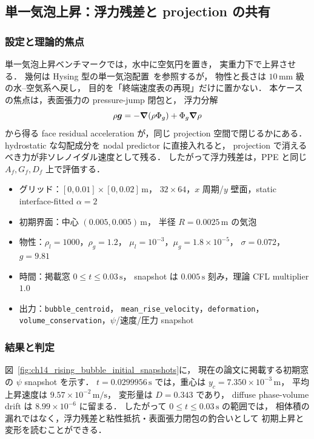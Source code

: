 \subsection{単一気泡上昇：浮力残差と projection の共有}
\label{sec:val_rising_bubble}

\subsubsection{設定と理論的焦点}

単一気泡上昇ベンチマークでは，水中に空気円を置き，
実重力下で上昇させる．
幾何は Hysing 型の単一気泡配置~\cite{Hysing2009}を参照するが，
物性と長さは $10\,\mathrm{mm}$ 級の水--空気系へ戻し，
目的を「終端速度表の再現」だけに置かない．
本ケースの焦点は，表面張力の pressure-jump 閉包と，
浮力分解
\[
  \rho\bm{g}=-\bm{\nabla}(\rho\Phi_g)+\Phi_g\bm{\nabla}\rho
\]
から得る face residual acceleration が，同じ projection 空間で閉じるかにある．
hydrostatic な勾配成分を nodal predictor に直接入れると，
projection で消えるべき力が非ソレノイダル速度として残る．
したがって浮力残差は，PPE と同じ $A_f,G_f,D_f$ 上で評価する．

\begin{itemize}[noitemsep,leftmargin=2em]
  \item グリッド：$[0,0.01]\times[0,0.02]\,\mathrm{m}$，
        $32\times64$，$x$ 周期/$y$ 壁面，static interface-fitted $\alpha=2$
  \item 初期界面：中心 $(0.005,0.005)\,\mathrm{m}$，
        半径 $R=0.0025\,\mathrm{m}$ の気泡
  \item 物性：$\rho_l=1000$，$\rho_g=1.2$，
        $\mu_l=10^{-3}$，$\mu_g=1.8\times10^{-5}$，
        $\sigma=0.072$，$g=9.81$
  \item 時間：掲載窓 $0\le t\le0.03\,\mathrm{s}$，
        snapshot は $0.005\,\mathrm{s}$ 刻み，理論 CFL multiplier $1.0$
  \item 出力：\texttt{bubble\_centroid}，
        \texttt{mean\_rise\_velocity}，\texttt{deformation}，
        \texttt{volume\_conservation}，$\psi$/速度/圧力 snapshot
\end{itemize}

\subsubsection{結果と判定}

図~\ref{fig:ch14_rising_bubble_initial_snapshots}に，
現在の論文に掲載する初期窓の $\psi$ snapshot を示す．
$t=0.0299956\,\mathrm{s}$ では，重心は
$y_c=7.350\times10^{-3}\,\mathrm{m}$，
平均上昇速度は $9.57\times10^{-2}\,\mathrm{m/s}$，
変形量は $D=0.343$ であり，
diffuse phase-volume drift は $8.99\times10^{-6}$ に留まる．
したがって $0\le t\le0.03\,\mathrm{s}$ の範囲では，
相体積の漏れではなく，浮力残差と粘性抵抗・表面張力閉包の釣合いとして
初期上昇と変形を読むことができる．

